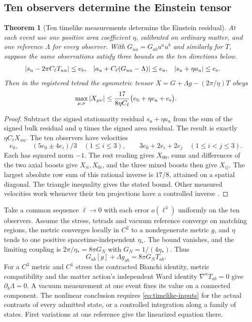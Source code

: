 \documentclass[11pt]{article}
\newtheorem{theorem}{Theorem}[section]
\theoremstyle{definition}
\theoremstyle{remark}
\begin{document}
\subsection{Ten observers determine the Einstein tensor}
\label{sec:einstein-theorem}

\begin{theorem}[Ten timelike measurements determine the Einstein residual]
\label{thm:einstein}
At each event use one positive area coefficient $\eta$, calibrated on
ordinary matter, and one reference $\Lambda$ for every observer. With
$G_{uu}=G_{ab}u^a u^b$ and similarly for $T$, suppose the same observations
satisfy three bounds on the ten directions below.
\begin{align}
 |s_u-2\pi C_\ell T_{uu}|&\le e_{\rm b}, &
 |a_u+C_\ell(G_{uu}-\Lambda)|&\le e_{\rm a}, &
 |s_u+\eta a_u|&\le e_{\rm s}. \label{eq:timelike-inputs}
\end{align}
Then in the registered tetrad the symmetric tensor
$X=G+\Lambda g-(2\pi/\eta)T$ obeys
\[
 \max_{\mu,\nu}|X_{\mu\nu}|
 \le \frac{17}{8\eta C_\ell}
       \bigl(e_{\rm b}+\eta e_{\rm a}+e_{\rm s}\bigr).
\]
\end{theorem}
\begin{proof}
Subtract the signed stationarity residual $s_u+\eta a_u$ from the sum
of the signed bulk residual and $\eta$ times the signed area residual.
The result is exactly $\eta C_\ell X_{uu}$. The ten observers have velocities
\[
 e_0,\qquad (5e_0\pm4e_i)/3\quad (1\le i\le3),\qquad
 3e_0+2e_i+2e_j\quad (1\le i<j\le3).
\]
Each has squared norm $-1$. The rest reading gives $X_{00}$, sums and
differences of the two axial boosts give $X_{ii},X_{0i}$, and the three
mixed boosts then give $X_{ij}$. The largest absolute row sum of this
rational inverse is $17/8$, attained on a spatial diagonal. The triangle
inequality gives the stated bound. Other measured velocities work whenever
their ten projections have a controlled inverse \cite{ophrepo,ophEinstein}.
\end{proof}

Take a common sequence $\ell\to0$ with each error $o(\ell^4)$ uniformly on
the ten observers. Assume the stress, tetrads and vacuum reference converge
on matching regions, the metric converges locally in $C^2$ to a nondegenerate
metric $g$, and $\eta$ tends to one positive spacetime-independent
$\eta_*$. The bound vanishes, and the limiting coupling is
$2\pi/\eta_*=8\pi G_N$ with $G_N=1/(4\eta_*)$. Thus
\begin{equation}
 G_{ab}[g]+\Lambda g_{ab}=8\pi G_NT_{ab}. \label{eq:einstein}
\end{equation}
For a $C^3$ metric and $C^1$ stress the contracted Bianchi identity,
metric compatibility and the matter action's independent Ward identity
$\nabla^a T_{ab}=0$ give $\partial_b\Lambda=0$. A vacuum measurement at one
event fixes its value on a connected component. The nonlinear conclusion
requires \eqref{eq:timelike-inputs} for the actual contrasts of every
admitted state, or a controlled integration along a family of states.
First variations at one reference give the linearized equation there.
\end{document}
